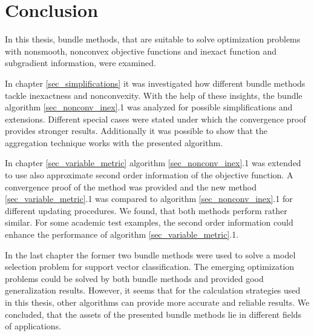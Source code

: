 
\section{Conclusion}

In this thesis, bundle methods, that are suitable to solve optimization problems with nonsmooth, nonconvex objective functions and inexact function and subgradient information, were examined.

In chapter \ref{sec_simplifications} it was investigated how different bundle methods tackle inexactness and nonconvexity. With the help of these insights, the bundle algorithm \ref{sec_nonconv_inex}.1 was analyzed for possible simplifications and extensions. Different special cases were stated under which the convergence proof provides stronger results.
Additionally it was possible to show that the aggregation technique works with the presented algorithm.

In chapter \ref{sec_variable_metric} algorithm \ref{sec_nonconv_inex}.1 was extended to use also approximate second order information of the objective function. A convergence proof of the method was provided and the new method \ref{sec_variable_metric}.1 was compared to algorithm \ref{sec_nonconv_inex}.1 for different updating procedures. 
We found, that both methods perform rather similar. For some academic test examples, the second order information could enhance the performance of algorithm \ref{sec_variable_metric}.1.

In the last chapter the former two bundle methods were used to solve a model selection problem for support vector classification.
The emerging optimization problems could be solved by both bundle methods and provided good generalization results. However, it seems that for the calculation strategies used in this thesis, other algorithms can provide more accurate and reliable results.
We concluded, that the assets of the presented bundle methods lie in different fields of applications.
